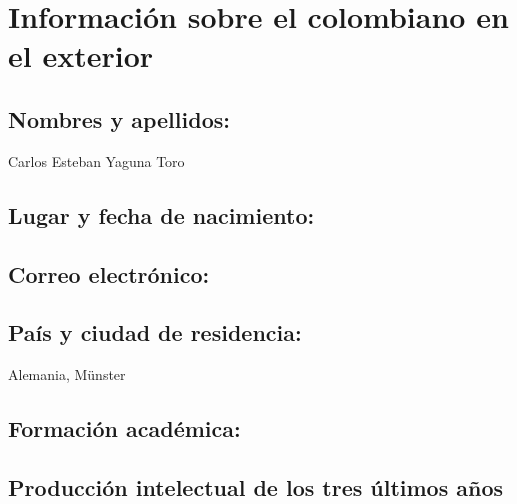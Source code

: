 \section{Información sobre el colombiano en el exterior}
\subsection{Nombres y apellidos: }
Carlos Esteban Yaguna Toro
\subsection{Lugar y fecha de nacimiento: }
\fnyaguna
\subsection{Correo electrónico: }
\emyaguna
\subsection{País y ciudad de residencia: }
Alemania, M\"unster
\subsection{Formación académica:}
\subsection{Producción intelectual de los tres últimos años}

